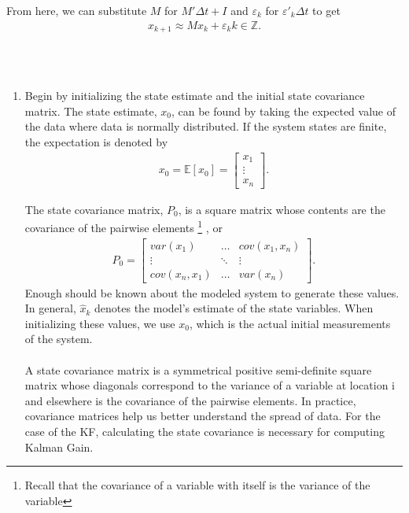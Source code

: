 From here, we can substitute $M$ for $M' \Delta t + I$ and $\varepsilon_k$ for  $\varepsilon '_k  \Delta t $ to get
\begin{align*}
	x_{k+1} \approx M x_k + \varepsilon_k   k \in \mathbb{Z}.
\end{align*}

\\ \\ 

\begin{enumerate}
  \item Begin by initializing the state estimate and the initial state covariance matrix. The state estimate, $x_0$, can be found by taking the expected value of the data where data is normally distributed. If the system states are finite, the expectation is denoted by
    \begin{align*}
        x_0 = \mathbb{E}[x_0]  = \begin{bmatrix}
           x_1 \\
           \vdots \\
           x_n 
         \end{bmatrix}.
    \end{align*}
    
    The state covariance matrix, $P_0$, is a square matrix whose contents are the covariance of the pairwise elements
    \footnote{Recall that the covariance of a variable with itself is the variance of the variable}
    , or
    \begin{align*}
      P_0 =
      \begin{bmatrix}
           var(x_1)  & \hdots & cov(x_1,x_n) \\
           \vdots & \ddots & \vdots \\
           cov(x_n, x_1)  & \hdots & var(x_n )
         \end{bmatrix} .
  \end{align*}
  Enough should be known about the modeled system to generate these values. In general, $\hat x_k$ denotes the model's estimate of the state variables. When initializing these values, we use $x_0$, which is the actual initial measurements of the system. \\ \\
   A state covariance matrix is a symmetrical positive semi-definite square matrix whose diagonals correspond to the variance of a variable at location i and elsewhere is the covariance of the pairwise elements. In practice, covariance matrices help us better understand the spread of data. For the case of the KF, calculating the state covariance is necessary for computing Kalman Gain. 
   

\end{enumerate}
